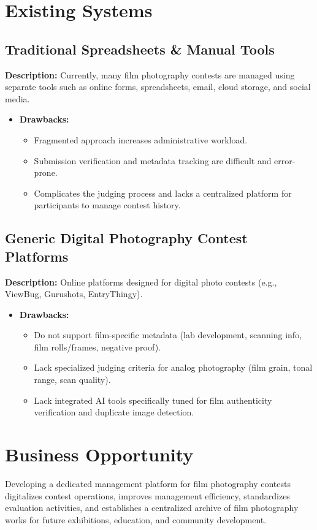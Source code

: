 \section{Existing Systems}
\subsection{Traditional Spreadsheets \& Manual Tools}
\textbf{Description:} Currently, many film photography contests are managed using separate tools such as online forms, spreadsheets, email, cloud storage, and social media.
\begin{itemize}
    \item \textbf{Drawbacks:}
    \begin{itemize}
        \item Fragmented approach increases administrative workload.
        \item Submission verification and metadata tracking are difficult and error-prone.
        \item Complicates the judging process and lacks a centralized platform for participants to manage contest history.
    \end{itemize}
\end{itemize}

\subsection{Generic Digital Photography Contest Platforms}
\textbf{Description:} Online platforms designed for digital photo contests (e.g., ViewBug, Gurushots, EntryThingy).
\begin{itemize}
    \item \textbf{Drawbacks:}
    \begin{itemize}
        \item Do not support film-specific metadata (lab development, scanning info, film rolls/frames, negative proof).
        \item Lack specialized judging criteria for analog photography (film grain, tonal range, scan quality).
        \item Lack integrated AI tools specifically tuned for film authenticity verification and duplicate image detection.
    \end{itemize}
\end{itemize}

\section{Business Opportunity}
Developing a dedicated management platform for film photography contests digitalizes contest operations, improves management efficiency, standardizes evaluation activities, and establishes a centralized archive of film photography works for future exhibitions, education, and community development.

